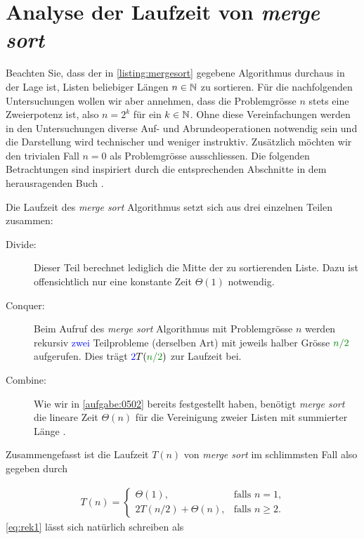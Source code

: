 \section{Analyse der Laufzeit von \textit{merge sort}}
Beachten Sie, dass der in \cref{listing:mergesort} gegebene Algorithmus durchaus in der Lage ist, Listen beliebiger Längen $n\in\mathbb{N}$ zu sortieren. Für die nachfolgenden Untersuchungen wollen wir aber annehmen, dass die Problemgrösse $n$ stets eine Zweierpotenz ist, also $n = 2^k$ für ein $k\in\mathbb{N}$. Ohne diese Vereinfachungen werden in den Untersuchungen diverse Auf- und Abrundeoperationen notwendig sein und die Darstellung wird technischer und weniger instruktiv. Zusätzlich möchten wir den trivialen Fall $n = 0$ als Problemgrösse ausschliessen. Die folgenden Betrachtungen sind inspiriert durch die entsprechenden Abschnitte in dem herausragenden Buch \cite{IntroductionAlgo}.

Die Laufzeit des \textit{merge sort} Algorithmus setzt sich aus drei einzelnen Teilen zusammen:
\begin{description}
  \item[Divide:] Dieser Teil berechnet lediglich die Mitte der zu sortierenden Liste. Dazu ist offensichtlich nur eine konstante Zeit $\Theta(1)$ notwendig.
  \item[Conquer:] Beim Aufruf des \textit{merge sort} Algorithmus mit Problemgrösse $n$ werden rekursiv \textcolor{Blue}{zwei} Teilprobleme (derselben Art) mit jeweils halber Grösse $\textcolor{Green}{n/2}$ aufgerufen. Dies trägt $\textcolor{Blue}{2}T(\textcolor{Green}{n/2})$ zur Laufzeit bei.
  \item[Combine:] Wie wir in \cref{aufgabe:0502} bereits festgestellt haben, benötigt \textit{merge sort} die lineare Zeit $\Theta(n)$ für die Vereinigung zweier Listen mit summierter Länge .
\end{description}
Zusammengefasst ist die Laufzeit $T(n)$ von \textit{merge sort} im schlimmsten Fall also gegeben durch

\begin{align}\label{eq:rek1}
  T(n) = 
  \begin{cases}
    \Theta(1), &\text{falls $n = 1$,} \\
    2T(n/2) + \Theta(n), & \text{falls $n\geq 2$}.
  \end{cases}
\end{align}
\cref{eq:rek1} lässt sich natürlich schreiben als

